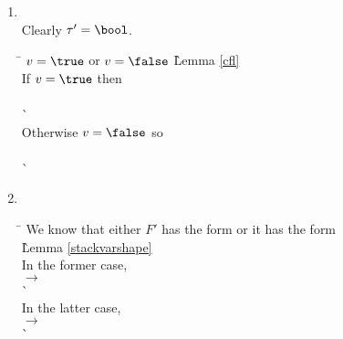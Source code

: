\begin{enumerate}
\begin{enumerate}
\begin{enumerate}
\begin{enumerate}
\begin{itemize}
        \end{itemize}

      \item {} \ \\
        Clearly $\tau' = \bool$.

        \begin{tabbing}
        \hspace{2em} \= \kill
        $v = \true$ or $v = \false$
          \` Lemma \ref{cfl} \\
        If $v = \true$ then \+ \\
           \\
            \`  \- \\
        Otherwise $v = \false$ so \+ \\
           \\
            \`  \- \\
        \end{tabbing}

      \item {} \ \\

        \begin{tabbing}
        \hspace{2em} \= \kill
        We know that either $F'$ has the form  or it has the form \\
          \` Lemma \ref{stackvarshape} \\
        In the former case, \\
            $\rightarrow$ \+ \\
           \-
            \`  \\
        In the latter case, \\
            $\rightarrow$ \+ \\
           \-
            \`  \\
        \end{tabbing}


\end{enumerate}
\end{enumerate}
\end{enumerate}
\end{enumerate}
